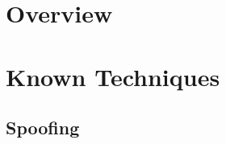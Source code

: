 \documentclass[11pt,fleqn,oneside]{book} %
\begin{document}

\coverpage{\TITLE}{\SUBTITLE}{\AUTHOR}{\DATE}{\SUBJECT}
\newpage
\backgroundbarvisiblefalse



\newpage
\tableofcontents

\part{Overview}




\part{Known Techniques}
\chapter{Spoofing} \label{ch:known-spoofing}


\newpage
\newpage
\end{document}

